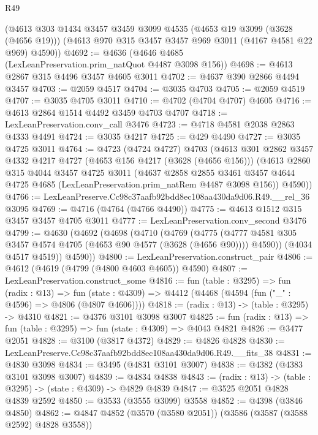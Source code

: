 \begin{lexlean}{R49}
\begin{coremodule}
    (@4613
      @303
      @1434
      @3457
      @3459
      @3099
      @4535
      (@4653 @19 @3099 (@3628 (@4656 @19)))
      (@4613 @970 @315 @3457 @3457 @969 @3011 (@4167 @4581 @22 @969) @4590))
@4692 := @4636 (@4646 @4685 (LexLeanPreservation.prim_natQuot @4487 @3098 @156))
@4698 := @4613 @2867 @315 @4496 @3457 @4605 @3011
@4702 := @4637 @390 @2866 @4494 @3457
@4703 := @2059 @4517
@4704 := @3035 @4703
@4705 := @2059 @4519
@4707 := @3035 @4705 @3011
@4710 := @4702 (@4704 @4707) @4605
@4716 := @4613 @2864 @1514 @4492 @3459 @4703 @4707
@4718 := LexLeanPreservation.conv_call @3476
@4723 := @4718 @4581 @2038 @2863 @4333 @4491
@4724 := @3035 @4217
@4725 := @429 @4490
@4727 := @3035 @4725 @3011
@4764 := @4723
    (@4724 @4727)
    @4703
    (@4613
      @301
      @2862
      @3457
      @4332
      @4217
      @4727
      (@4653 @156 @4217 (@3628 (@4656 @156)))
      (@4613
        @2860
        @315
        @4044
        @3457
        @4725
        @3011
        (@4637
          @2858
          @2855
          @3461
          @3457
          @4644
          @4725
          @4685
          (LexLeanPreservation.prim_natRem @4487 @3098 @156))
        @4590))
@4766 := LexLeanPreserve.Cc98c37aafb92bdd8ec108aa430da9d06.R49.__rel_36 @3095
@4769 := @4716 (@4764 (@4766 @4490))
@4775 := @4613 @1512 @315 @3457 @3457 @4705 @3011
@4777 := LexLeanPreservation.conv_second @3476
@4799 := @4630
    (@4692
      (@4698
        (@4710
          (@4769
            (@4775
              (@4777 @4581 @305 @3457 @4574 @4705 (@4653 @90 @4577 (@3628 (@4656 @90))))
              @4590))
          (@4034 @4517 @4519))
        @4590))
@4800 := LexLeanPreservation.construct_pair
@4806 := @4612 (@4619 (@4799 (@4800 @4603 @4605)) @4590)
@4807 := LexLeanPreservation.construct_some
@4816 := fun (table : @3295) =>
  fun (radix : @13) =>
  fun (state : @4309) => @4412 (@4468 (@4594 (fun ("_" : @4596) => @4806 (@4807 @4606))))
@4818 := (radix : @13) -> (table : @3295) -> @4310
@4821 := @4376 @3101 @3098 @3007
@4825 := fun (radix : @13) => fun (table : @3295) => fun (state : @4309) => @4043 @4821
@4826 := @3477 @2051
@4828 := @3100 (@3817 @4372)
@4829 := @4826 @4828
@4830 := LexLeanPreserve.Cc98c37aafb92bdd8ec108aa430da9d06.R49.__fits_38
@4831 := @4830 @3098
@4834 := @3495 (@4831 @3101 @3007)
@4838 := @4382 (@4383 @3101 @3098 @3007)
@4839 := @4834 @4838
@4843 := (radix : @13) -> (table : @3295) -> (state : @4309) -> @4829 @4839
@4847 := @3525 @2051 @4828 @4839 @2592
@4850 := @3533 (@3555 @3099) @3558
@4852 := @4398 (@3846 @4850)
@4862 := @4847 @4852 (@3570 (@3580 @2051)) (@3586 (@3587 (@3588 @2592) @4828 @3558))

\end{coremodule}
\end{lexlean}

